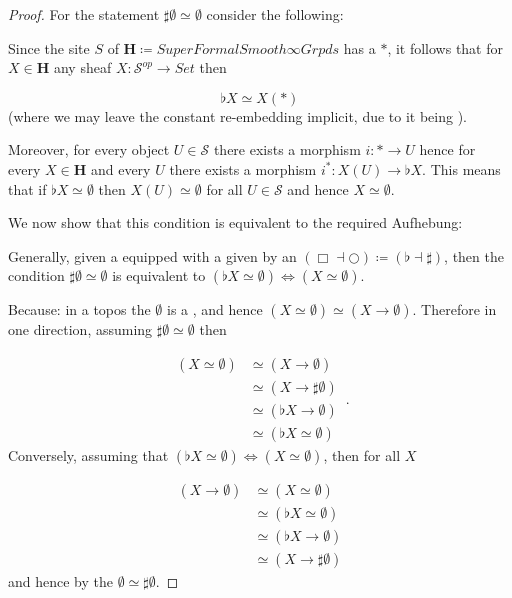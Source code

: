 \documentclass[12pt,titlepage]{article}
\theoremstyle{plain}
\theoremstyle{definition}
\theoremstyle{remark}
\begin{document}
\begin{proof}
For the statement $\sharp \emptyset \simeq \emptyset$ consider the following:

Since the site $S$ of $\mathbf{H} \coloneqq SuperFormalSmooth\infty Grpds$ has a  $\ast$, it follows that for $X\in \mathbf{H}$ any sheaf $X \colon \mathcal{S}^{op}\to Set$ then

\begin{displaymath}
\flat X \simeq X(\ast)
\end{displaymath}
(where we may leave the constant re-embedding implicit, due to it being ).

Moreover, for every object $U\in \mathcal{S}$ there exists a morphism $i \colon \ast \to U$ hence for every $X\in \mathbf{H}$ and every $U$ there exists a morphism $i^\ast \colon X(U)\to \flat X$. This means that if $\flat X \simeq \emptyset$ then $X(U) \simeq \emptyset$ for all $U \in \mathcal{S}$ and hence $X\simeq \emptyset$.

We now show that this condition is equivalent to the required Aufhebung:

Generally, given a  equipped with a  given by an  $(\Box\dashv \bigcirc) \coloneqq (\flat \dashv \sharp)$, then the condition $\sharp \emptyset \simeq \emptyset$ is equivalent to $(\flat X \simeq \emptyset) \Leftrightarrow (X \simeq \emptyset)$.

Because: in a topos the  $\emptyset$ is a , and hence $(X \simeq \emptyset) \simeq (X \to \emptyset)$. Therefore in one direction, assuming $\sharp \emptyset \simeq \emptyset$ then

\begin{displaymath}
\begin{aligned}
    (X \simeq \emptyset)
    & \simeq
    (X \to \emptyset)
    \\
    & \simeq (X \to \sharp \emptyset)
    \\
    & \simeq (\flat X \to \emptyset)
    \\
    & \simeq (\flat X \simeq \emptyset)
  \end{aligned}
  \,.
\end{displaymath}
Conversely, assuming that $(\flat X \simeq \emptyset) \Leftrightarrow (X \simeq \emptyset)$, then for all $X$

\begin{displaymath}
\begin{aligned}
    (X\to \emptyset)
    & \simeq
    (X\simeq \emptyset)
   \\
    & \simeq (\flat X \simeq \emptyset)
    \\
    & \simeq (\flat X \to \emptyset)
    \\
    & \simeq (X\to \sharp \emptyset)
  \end{aligned}
\end{displaymath}
and hence by the  $\emptyset \simeq \sharp \emptyset$.




\end{proof}
\end{document}
